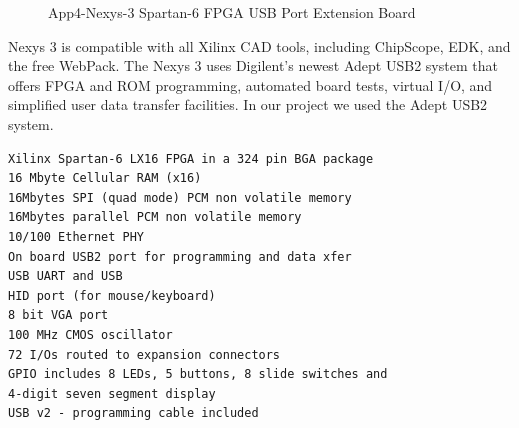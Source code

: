 \begin{figure}[htbp]
	\begin{center}
		\caption{App4-Nexys-3 Spartan-6 FPGA USB Port Extension Board}
		\label{fig:App4-Captured-Nexys3-Spartan6-FPGA-USB-Extension-Board.jpg}
	\end{center}
\end{figure}

Nexys 3 is compatible with all Xilinx CAD tools, including ChipScope, EDK, and the free WebPack. The Nexys 3 uses Digilent's newest Adept USB2 system that offers FPGA and ROM programming, automated board tests, virtual I/O, and simplified user data transfer facilities. In our project we used the Adept USB2 system.

\lstset{basicstyle=\ttfamily\small}
\begin{lstlisting}[breaklines, frame=single, caption={App4-Specifications of Nexys-3 Spartan-6 FPGA USB Interface Board}, label=App4-Specifications-Nexys-3-Spartan-6-FPGA-USB-Interface-Board]
Xilinx Spartan-6 LX16 FPGA in a 324 pin BGA package
16 Mbyte Cellular RAM (x16)
16Mbytes SPI (quad mode) PCM non volatile memory
16Mbytes parallel PCM non volatile memory
10/100 Ethernet PHY
On board USB2 port for programming and data xfer
USB UART and USB
HID port (for mouse/keyboard)
8 bit VGA port
100 MHz CMOS oscillator
72 I/Os routed to expansion connectors
GPIO includes 8 LEDs, 5 buttons, 8 slide switches and 
4-digit seven segment display
USB v2 - programming cable included
\end{lstlisting}


